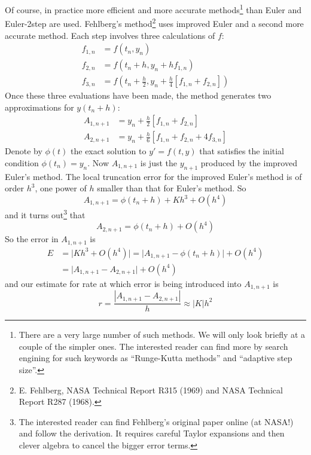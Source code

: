 Of course, in practice more efficient and more accurate methods\footnote{There are a very large number of such methods. We will only look briefly at a couple of the simpler ones. The interested reader can find more by search engining for such keywords as ``Runge-Kutta methods'' and ``adaptive step size''. } than 
Euler and Euler-2step are used. Fehlberg's method\footnote{E. Fehlberg, 
NASA Technical Report R315 (1969) and NASA Technical Report R287 (1968).} 
uses improved Euler and a second more accurate method. Each step involves 
three calculations of $f$:
\begin{align*}
f_{1,n}&=f(t_n,y_n) \\
f_{2,n}&=f(t_n+h,y_n+hf_{1,n}) \\
f_{3,n}&=f\left(t_n+\tfrac{h}{2},y_n+\tfrac{h}{4}[f_{1,n}+f_{2,n}]\right)
\end{align*}
Once these three evaluations have been made, the method generates two
approximations for $y(t_n+h)$:
\begin{align*}
A_{1,n+1}&=y_n+\tfrac{h}{2}\left[f_{1,n}+f_{2,n}\right] \\
A_{2,n+1}&=y_n+\tfrac{h}{6}\left[f_{1,n}+f_{2,n}+4f_{3,n}\right]
\end{align*}
Denote by $\phi(t)$ the exact solution to $y'=f(t,y)$ that satisfies 
the initial condition $\phi(t_n)=y_n$.  Now $A_{1,n+1}$ is just the $y_{n+1}$
produced by the improved Euler's method. The local truncation error for the
improved Euler's method is of order $h^3$, one power of $h$ smaller than that
for Euler's method. So
\begin{equation*}
A_{1,n+1} = \phi(t_n+h) + Kh^3+O(h^4) 
\end{equation*}
and it turns out\footnote{The interested reader can find Fehlberg's original paper online (at NASA!) and follow the derivation. It requires careful Taylor expansions and then clever algebra to cancel the bigger error terms.} that
\begin{equation*}
A_{2,n+1} = \phi(t_n+h) + O(h^4) 
\end{equation*}
So the  error in $A_{1,n+1}$ is
\begin{align*}
E&=\big|Kh^3+O(h^4)\big|
  =\big|A_{1,n+1}-\phi(t_n+h)\big|+O(h^4) \\
  &=\big|A_{1,n+1}-A_{2,n+1}\big|+O(h^4)
\end{align*}
and our estimate for rate at which error is being introduced into $A_{1,n+1}$ is
\begin{equation*}
r=\frac{|A_{1,n+1}-A_{2,n+1}|}{h}\approx |K|h^2
\end{equation*}
